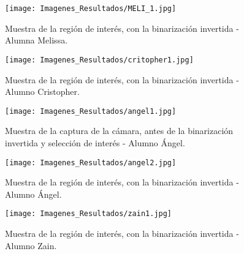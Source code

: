 \documentclass[12pt, letterpaper]{article}
\begin{document}
\begin{figure}[H]
    \centering
    \texttt{[image: Imagenes\_Resultados/MELI\_1.jpg]} 
    \caption{Muestra de la región de interés, con la binarización invertida - Alumna Melissa.}
    \label{fig:etiqueta}
\end{figure}

\begin{figure}[H]
    \centering
    \texttt{[image: Imagenes\_Resultados/critopher1.jpg]} 
    \caption{Muestra de la región de interés, con la binarización invertida - Alumno Cristopher.}
    \label{fig:etiqueta}
\end{figure}

\begin{figure}[H]
    \centering
    \texttt{[image: Imagenes\_Resultados/angel1.jpg]} 
    \caption{Muestra de la captura de la cámara, antes de la binarización invertida y selección de interés - Alumno Ángel.}
    \label{fig:etiqueta}
\end{figure}

\begin{figure}[H]
    \centering
    \texttt{[image: Imagenes\_Resultados/angel2.jpg]} 
    \caption{Muestra de la región de interés, con la binarización invertida - Alumno Ángel.}
    \label{fig:etiqueta}
\end{figure}

\begin{figure}[H]
    \centering
    \texttt{[image: Imagenes\_Resultados/zain1.jpg]} 
    \caption{Muestra de la región de interés, con la binarización invertida - Alumno Zain.}
    \label{fig:etiqueta}
\end{figure}
\end{document}
